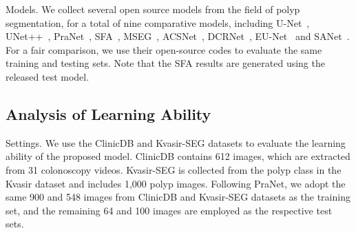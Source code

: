 \documentclass[journal]{IEEEtran}
\begin{document}
\textcolor[RGB]{31,100,212}{Models.} We collect several open source models from the field of polyp segmentation, for a total of nine comparative models, including U-Net~\cite{ronneberger2015unet}, UNet++~\cite{zhou2018unet++}, PraNet~\cite{fan2020pranet}, SFA~\cite{fang2019sfa}, MSEG~\cite{huang2021hardnet}, ACSNet~\cite{zhang2020ACSN}, DCRNet~\cite{yin2021duplex}, EU-Net~\cite{PatelBW21} and SANet~\cite{wei2021shallow}. 
For a fair comparison, we use their open-source codes to evaluate the same training and testing sets. Note that the SFA results are generated using the released test model. 

\subsection{Analysis of Learning Ability}
\textcolor[RGB]{31,100,212}{Settings.} We use the ClinicDB and Kvasir-SEG datasets to evaluate the learning ability of the proposed model. ClinicDB contains 612 images, which are extracted from 31 colonoscopy videos. Kvasir-SEG is collected from the polyp class in the Kvasir dataset and includes 1,000 polyp images.
Following PraNet, we adopt the same 900 and 548 images from ClinicDB and Kvasir-SEG datasets as the training set, and the remaining 64 and 100 images are employed as the respective test sets. 
 
\end{document}
